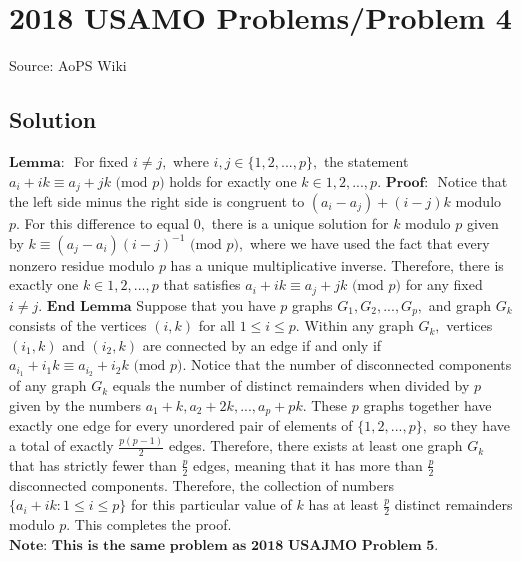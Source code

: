\documentclass[12pt]{article}
\begin{document}
\section*{{2018 USAMO Problems/Problem 4}}
Source: AoPS Wiki

\subsection*{Solution}
$\textbf{Lemma: }$ For fixed $i\neq j,$ where $i, j\in\{1, 2, ..., p\},$ the statement $a_i + ik\equiv a_j + jk\text{ (mod } p\text{)}$ holds for exactly one $k\in {1, 2, ..., p}.$ $\textbf{Proof: }$ Notice that the left side minus the right side is congruent to $(a_i - a_j) + (i - j)k$ modulo $p.$ For this difference to equal $0,$ there is a unique solution for $k$ modulo $p$ given by $k\equiv (a_j - a_i)(i - j)^{-1}\text{ (mod } p\text{)},$ where we have used the fact that every nonzero residue modulo $p$ has a unique multiplicative inverse. Therefore, there is exactly one $k\in {1, 2, ..., p}$ that satisfies $a_i + ik\equiv a_j + jk\text{ (mod } p\text{)}$ for any fixed $i\neq j. \textbf{ End Lemma}$ Suppose that you have $p$ graphs $G_1, G_2, ..., G_p,$ and graph $G_k$ consists of the vertices $(i, k)$ for all $1\le i\le p.$ Within any graph $G_k,$ vertices $(i_1, k)$ and $(i_2, k)$ are connected by an edge if and only if $a_{i_1} + i_1k\equiv a_{i_2} + i_2k\text{ (mod } p\text{)}.$ Notice that the number of disconnected components of any graph $G_k$ equals the number of distinct remainders when divided by $p$ given by the numbers $a_1 + k, a_2 + 2k, ..., a_p + pk.$ These $p$ graphs together have exactly one edge for every unordered pair of elements of $\{1, 2, ..., p\},$ so they have a total of exactly $\frac{p(p-1)}{2}$ edges. Therefore, there exists at least one graph $G_k$ that has strictly fewer than $\frac{p}{2}$ edges, meaning that it has more than $\frac{p}{2}$ disconnected components. Therefore, the collection of numbers $\{a_i + ik: 1\le i\le p\}$ for this particular value of $k$ has at least $\frac{p}{2}$ distinct remainders modulo $p.$ This completes the proof. $\textbf{Note: This is the same problem as 2018 USAJMO Problem 5.}$
\end{document}
